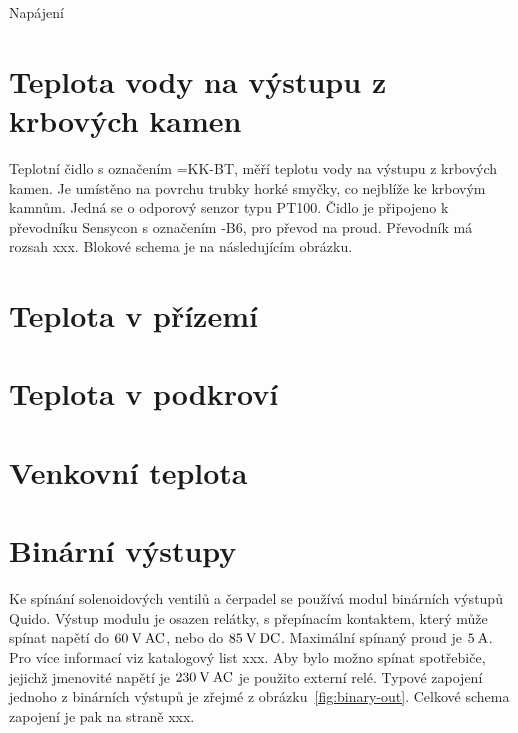 \documentclass{book}
\begin{document}
    Napájení

    \section{Teplota vody na výstupu z krbových kamen}

        Teplotní čidlo s označením =KK-BT, měří teplotu vody na
        výstupu z krbových kamen. Je umístěno na povrchu
        trubky horké smyčky, co nejblíže ke krbovým kamnům. Jedná se o odporový
        senzor typu PT100. Čidlo je připojeno k převodníku
        Sensycon s označením -B6, pro převod na
        proud. Převodník má rozsah xxx. Blokové schema je na následujícím
        obrázku.

        \begin{tikzpicture}[scale=1.0]
        \end{tikzpicture}

    \section{Teplota v přízemí}

    \section{Teplota v podkroví}

    \section{Venkovní teplota}

    \section{Binární výstupy}

        Ke spínání solenoidových ventilů a čerpadel se používá modul binárních
        výstupů Quido. Výstup modulu je
        osazen relátky, s přepínacím kontaktem, který může spínat napětí do
        $60\rm\:V\:AC$, nebo do $85\rm\:V\:DC$. Maximální spínaný proud je
        $5\rm\:A$. Pro více informací viz katalogový list xxx. Aby bylo možno
        spínat spotřebiče, jejichž jmenovité napětí je $230\rm\:V\:AC$ je
        použito externí relé. Typové zapojení jednoho z binárních výstupů je
        zřejmé z obrázku~\ref{fig:binary-out}. Celkové schema zapojení je pak
        na straně xxx.
\end{document}
